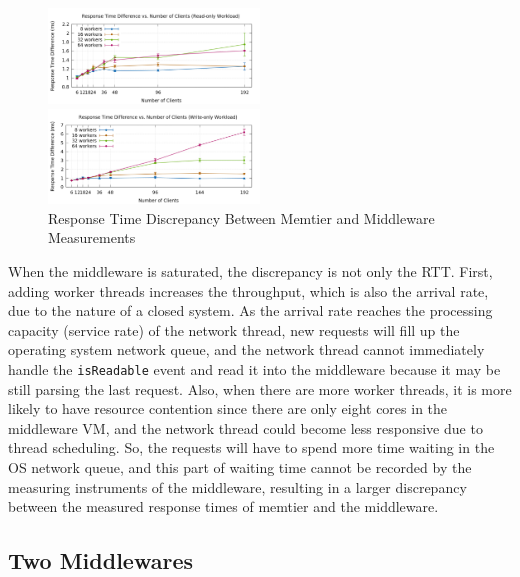 \begin{figure}[!h]
\parbox{.5\linewidth}{
\centering
\includegraphics[width=0.5\textwidth]{img/3_1_discrepancy_readonly.png}
}
\parbox{.5\linewidth}{
\centering
\includegraphics[width=0.5\textwidth]{img/3_1_discrepancy_writeonly.png}
}
\captionsetup{justification=centering}
\caption{\label{fig:3.1discrepancy}Response Time Discrepancy Between Memtier and Middleware Measurements}
\end{figure}

When the middleware is saturated, the discrepancy is not only the RTT. First, adding worker threads increases the throughput, which is also the arrival rate, due to the nature of a closed system. As the arrival rate reaches the processing capacity (service rate) of the network thread, new requests will fill up the operating system network queue, and the network thread cannot immediately handle the \texttt{isReadable} event and read it into the middleware because it may be still parsing the last request. Also, when there are more worker threads, it is more likely to have resource contention since there are only eight cores in the middleware VM, and the network thread could become less responsive due to thread scheduling. So, the requests will have to spend more time waiting in the OS network queue, and this part of waiting time cannot be recorded by the measuring instruments of the middleware, resulting in a larger discrepancy between the measured response times of memtier and the middleware.


\subsection{Two Middlewares}


